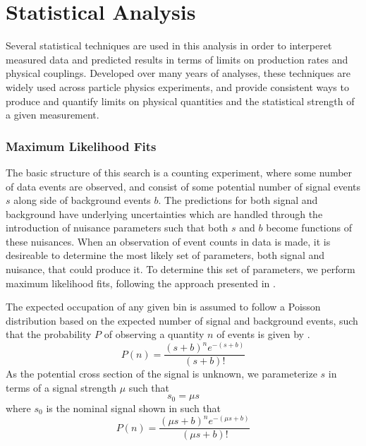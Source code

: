 \chapter{Statistical Analysis}
\label{analysis_chapter}
Several statistical techniques are used in this analysis in order to interperet measured data and predicted results in terms of limits on production rates and physical couplings.
Developed over many years of analyses, these techniques are widely used across particle physics experiments, and provide consistent ways to produce and quantify limits on physical quantities and the statistical strength of a given measurement.

\subsection{Maximum Likelihood Fits}
The basic structure of this search is a counting experiment, where some number of data events are observed, and consist of some potential number of signal events $s$ along side of background events $b$. 
The predictions for both signal and background have underlying uncertainties which are handled through the introduction of nuisance parameters such that both $s$ and $b$ become functions of these nuisances.
When an observation of event counts in data is made, it is desireable to determine the most likely set of parameters, both signal and nuisance, that could produce it. 
To determine this set of parameters, we perform maximum likelihood fits, following the approach presented in \cite{conway2011}. 

The expected occupation of any given bin is assumed to follow a Poisson distribution based on the expected number of signal and background events, such that the probability $P$ of observing a quantity $n$ of events is given by .
\begin{equation}
	\label{eq:poisProb}
	P(n) = \frac{(s+b)^{n}e^{-(s+b)}}{(s+b)!}
\end{equation}
As the potential cross section of the signal is unknown, we parameterize $s$ in terms of a signal strength $\mu$ such that
\begin{equation}
	s_0 = \mu s
\end{equation}
where $s_0$ is the nominal signal shown in  such that
\begin{equation}
	P(n) = \frac{(\mu s+b)^{n}e^{-(\mu s+b)}}{(\mu s+b)!}
\end{equation}

